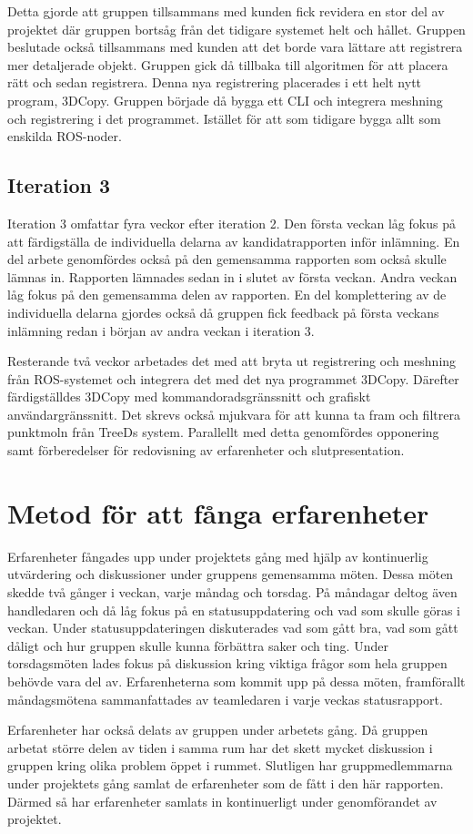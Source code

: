 Detta gjorde att gruppen tillsammans med kunden fick revidera en stor del av projektet där gruppen bortsåg från det tidigare systemet helt och hållet. Gruppen beslutade också tillsammans med kunden att det borde vara lättare att registrera mer detaljerade objekt. Gruppen gick då tillbaka till algoritmen för att placera rätt och sedan registrera. Denna nya registrering placerades i ett helt nytt program, 3DCopy. Gruppen började då bygga ett CLI och integrera meshning och registrering i det programmet. Istället för att som tidigare bygga allt som enskilda ROS-noder.

\subsection{Iteration 3}

Iteration 3 omfattar fyra veckor efter iteration 2. Den första veckan låg fokus på att färdigställa de individuella delarna av kandidatrapporten inför inlämning. En del arbete genomfördes också på den gemensamma rapporten som också skulle lämnas in. Rapporten lämnades sedan in i slutet av första veckan. Andra veckan låg fokus på den gemensamma delen av rapporten. En del komplettering av de individuella delarna gjordes också då gruppen fick feedback på första veckans inlämning redan i början av andra veckan i iteration 3.

Resterande två veckor arbetades det med att bryta ut registrering och meshning från ROS-systemet och integrera det med det nya programmet 3DCopy. Därefter färdigställdes 3DCopy med kommandoradsgränssnitt och grafiskt användargränssnitt. Det skrevs också mjukvara för att kunna ta fram och filtrera punktmoln från TreeDs system. Parallellt med detta genomfördes opponering samt förberedelser för redovisning av erfarenheter och slutp\-resentation.  


\section{Metod för att fånga erfarenheter}

Erfarenheter fångades upp under projektets gång med hjälp av kontinuerlig utvärdering och diskussioner under gruppens gemensamma möten. Dessa möten skedde två gånger i veckan, varje måndag och torsdag. På måndagar deltog även handledaren och då låg fokus på en statusuppdatering och vad som skulle göras i veckan. Under statusuppdateringen diskuterades vad som gått bra, vad som gått dåligt och hur gruppen skulle kunna förbättra saker och ting. Under torsdagsmöten lades fokus på diskussion kring viktiga frågor som hela gruppen behövde vara del av. Erfarenheterna som kommit upp på dessa möten, framförallt måndagsmötena sammanfattades av teamledaren i varje veckas statusrapport.

Erfarenheter har också delats av gruppen under arbetets gång. Då gruppen arbetat större delen av tiden i samma rum har det skett mycket diskussion i gruppen kring olika problem öppet i rummet. Slutligen har gruppmedlemmarna under projektets gång samlat de erfarenheter som de fått i den här rapporten. Därmed så har erfarenheter samlats in kontinuerligt under genomförandet av projektet.


